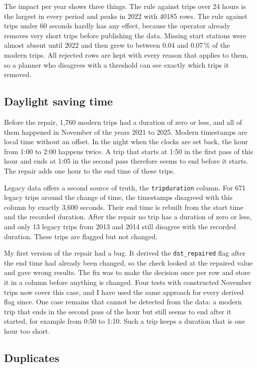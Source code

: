 \documentclass[11pt,a4paper]{article}
\newcommand{\code}[1]{\texttt{\small #1}}
\begin{document}
The impact per year shows three things. The rule against trips over 24 hours is the largest in every period and peaks in
2022 with \num{40185} rows. The rule against trips under 60 seconds hardly has any effect, because the operator already
removes very short trips before publishing the data. Missing start stations were almost absent until 2022 and then grew to
between 0.04 and 0.07\,\% of the modern trips. All rejected rows are kept with every reason that applies to them, so a
planner who disagrees with a threshold can see exactly which trips it removed.

\subsection{Daylight saving time}
\label{sec:dst}

Before the repair, 1,760 modern trips had a duration of zero or less, and all of them happened in November of the years
2021 to 2025. Modern timestamps are local time without an offset. In the night when the clocks are set back, the hour from
1:00 to 2:00 happens twice. A trip that starts at 1:50 in the first pass of this hour and ends at 1:05 in the second pass
therefore seems to end before it starts. The repair adds one hour to the end time of these trips.

Legacy data offers a second source of truth, the \code{tripduration} column. For 671 legacy trips around the change of
time, the timestamps disagreed with this column by exactly 3,600 seconds. Their end time is rebuilt from the start time and
the recorded duration. After the repair no trip has a duration of zero or less, and only 13 legacy trips from 2013 and
2014 still disagree with the recorded duration. These trips are flagged but not changed.

My first version of the repair had a bug. It derived the \code{dst\_repaired} flag after the end time had already been
changed, so the check looked at the repaired value and gave wrong results. The fix was to make the decision once per row
and store it in a column before anything is changed. Four tests with constructed November trips now cover this case, and I
have used the same approach for every derived flag since. One case remains that cannot be detected from the data: a modern
trip that ends in the second pass of the hour but still seems to end after it started, for example from 0:50 to 1:10. Such
a trip keeps a duration that is one hour too short.

\subsection{Duplicates}
\end{document}

